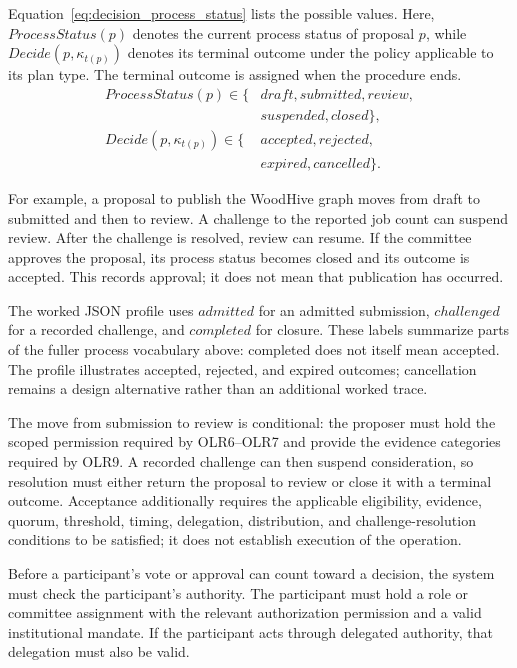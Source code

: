 \documentclass[journal]{IEEEtran}
\begin{document}
Equation~\ref{eq:decision_process_status} lists the possible
values. Here, $ProcessStatus(p)$ denotes the current process
status of proposal $p$, while $Decide(p,\kappa_{t(p)})$
denotes its terminal outcome under the policy applicable
to its plan type. %
The terminal outcome is assigned when the procedure ends.
\begin{equation}
\label{eq:decision_process_status}
\begin{aligned}
ProcessStatus(p)\in\{&
\mathit{draft},\mathit{submitted},\mathit{review},\\
&\mathit{suspended},\mathit{closed}\},\\
Decide(p,\kappa_{t(p)})\in\{&
\mathit{accepted},\mathit{rejected},\\
&\mathit{expired},\mathit{cancelled}\}.
\end{aligned}
\end{equation}

For example, a proposal to publish the WoodHive graph
moves from draft to submitted and then to review.
A challenge to the reported job count can suspend review.
After the challenge is resolved, review can resume.
If the committee approves the proposal, its process status
becomes closed and its outcome is accepted. This records
approval; it does not mean that publication has occurred.

The worked JSON profile uses $\mathit{admitted}$ for an admitted
submission, $\mathit{challenged}$ for a recorded challenge, and
$\mathit{completed}$ for closure. These labels summarize parts
of the fuller process vocabulary above: completed does not itself
mean accepted. The profile illustrates accepted, rejected, and
expired outcomes; cancellation remains a design alternative rather
than an additional worked trace.

The move from submission to review is conditional: the proposer must
hold the scoped permission required by OLR6--OLR7 and provide the
evidence categories required by OLR9. A recorded challenge can then
suspend consideration, so resolution must either return the proposal
to review or close it with a terminal outcome. Acceptance additionally
requires the applicable eligibility, evidence, quorum, threshold,
timing, delegation, distribution, and challenge-resolution conditions
to be satisfied; it does not establish execution of the operation.


Before a participant's vote or approval can count toward a
decision, the system must check the participant's authority.
The participant must hold a role or committee assignment with
the relevant authorization permission and a valid institutional
mandate. If the participant acts through delegated authority,
that delegation must also be valid.
\end{document}
